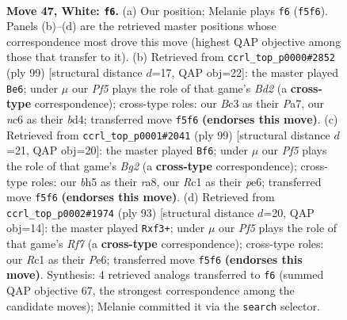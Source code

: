 \documentclass[11pt]{article}
\begin{document}
\clearpage

\begin{figure}[p]\centering
\begin{subfigure}{0.46\textwidth}\centering
\resizebox{\linewidth}{!}{%
\newchessgame
\chessboard[
  setfen={5k2/7r/p1n5/5P1b/1P6/2B5/P5K1/2R5 w - - 5 47},
  showmover=false,
  pgfstyle=straightmove, color=movearrow, markmove={f5-f6}
]}
\caption{}
\end{subfigure}\hfill
\begin{subfigure}{0.46\textwidth}\centering
\resizebox{\linewidth}{!}{%
\newchessgame
\chessboard[
  setfen={8/p2bk3/1p6/8/2PB1R2/r7/2K5/8 b - - 4 50},
  showmover=false,
  pgfstyle=straightmove, color=movearrow, markmove={d7-e6}
]}
\caption{}
\end{subfigure}
\\[4pt]
\begin{subfigure}{0.46\textwidth}\centering
\resizebox{\linewidth}{!}{%
\newchessgame
\chessboard[
  setfen={R7/6b1/4P2k/1p6/3p1p2/P2B4/1r6/4K3 b - - 0 50},
  showmover=false,
  pgfstyle=straightmove, color=movearrow, markmove={g7-f6}
]}
\caption{}
\end{subfigure}\hfill
\begin{subfigure}{0.46\textwidth}\centering
\resizebox{\linewidth}{!}{%
\newchessgame
\chessboard[
  setfen={5k2/7R/4p3/4b1PN/5p2/5P1K/5r2/8 b - - 0 47},
  showmover=false,
  pgfstyle=straightmove, color=movearrow, markmove={f2-f3}
]}
\caption{}
\end{subfigure}
\caption{\textbf{Move 47, White: \texttt{f6}.} (a) Our position; Melanie plays \texttt{f6} (\texttt{f5f6}). Panels (b)--(d) are the retrieved master positions whose correspondence most drove this move (highest QAP objective among those that transfer to it). (b) Retrieved from \texttt{ccrl\_top\_p0000\#2852} (ply 99) [structural distance $d$=17, QAP obj=22]: the master played \texttt{Be6}; under $\mu$ our \emph{Pf5} plays the role of that game's \emph{Bd2} (a \textbf{cross-type} correspondence); cross-type roles: our \emph{B}c3 as their \emph{P}a7, our \emph{n}c6 as their \emph{b}d4; transferred move \texttt{f5f6} \textbf{(endorses this move)}. (c) Retrieved from \texttt{ccrl\_top\_p0001\#2041} (ply 99) [structural distance $d$=21, QAP obj=20]: the master played \texttt{Bf6}; under $\mu$ our \emph{Pf5} plays the role of that game's \emph{Bg2} (a \textbf{cross-type} correspondence); cross-type roles: our \emph{b}h5 as their \emph{r}a8, our \emph{R}c1 as their \emph{p}e6; transferred move \texttt{f5f6} \textbf{(endorses this move)}. (d) Retrieved from \texttt{ccrl\_top\_p0002\#1974} (ply 93) [structural distance $d$=20, QAP obj=14]: the master played \texttt{Rxf3+}; under $\mu$ our \emph{Pf5} plays the role of that game's \emph{Rf7} (a \textbf{cross-type} correspondence); cross-type roles: our \emph{R}c1 as their \emph{P}e6; transferred move \texttt{f5f6} \textbf{(endorses this move)}. Synthesis: 4 retrieved analogs transferred to \texttt{f6} (summed QAP objective 67, the strongest correspondence among the candidate moves); Melanie committed it via the \texttt{search} selector.}
\label{fig:thought-m92}
\end{figure}
\end{document}
